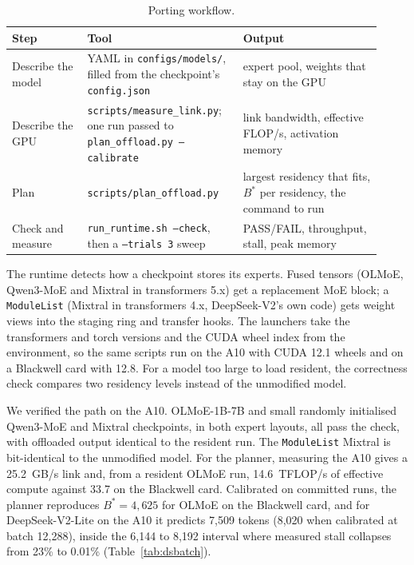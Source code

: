 \documentclass[10pt,a4paper]{article}
\begin{document}
\begin{table}[htbp]
\centering\small
\caption{Porting workflow.}
\label{tab:portsteps}
\begin{tabular}{>{\raggedright\arraybackslash}p{0.19\linewidth}>{\raggedright\arraybackslash}p{0.38\linewidth}>{\raggedright\arraybackslash}p{0.35\linewidth}}
\toprule
Step & Tool & Output \\
\midrule
Describe the model & YAML in \texttt{configs/models/}, filled from the checkpoint's \texttt{config.json} & expert pool, weights that stay on the GPU \\
Describe the GPU & \texttt{scripts/measure\_link.py}; one run passed to \texttt{plan\_offload.py --calibrate} & link bandwidth, effective FLOP/s, activation memory \\
Plan & \texttt{scripts/plan\_offload.py} & largest residency that fits, $B^{*}$ per residency, the command to run \\
Check and measure & \texttt{run\_runtime.sh --check}, then a \texttt{--trials 3} sweep & PASS/FAIL, throughput, stall, peak memory \\
\bottomrule
\end{tabular}
\end{table}

The runtime detects how a checkpoint stores its experts. Fused tensors (OLMoE,
Qwen3-MoE and Mixtral in transformers 5.x) get a replacement MoE block; a
\texttt{ModuleList} (Mixtral in transformers 4.x, DeepSeek-V2's own code) gets
weight views into the staging ring and transfer hooks. The launchers take the
transformers and torch versions and the CUDA wheel index from the environment, so
the same scripts run on the A10 with CUDA 12.1 wheels and on a Blackwell card with
12.8. For a model too large to load resident, the correctness check compares two
residency levels instead of the unmodified model.

We verified the path on the A10. OLMoE-1B-7B and small randomly initialised
Qwen3-MoE and Mixtral checkpoints, in both expert layouts, all pass the check, with
offloaded output identical to the resident run. The \texttt{ModuleList} Mixtral is
bit-identical to the unmodified model. For the planner, measuring the A10 gives a
25.2~GB/s link and, from a resident OLMoE run, 14.6~TFLOP/s of effective compute
against 33.7 on the Blackwell card. Calibrated on committed runs, the planner
reproduces $B^{*}=4{,}625$ for OLMoE on the Blackwell card, and for DeepSeek-V2-Lite
on the A10 it predicts 7{,}509 tokens (8{,}020 when calibrated at batch 12{,}288),
inside the 6{,}144 to 8{,}192 interval where measured stall collapses from 23\% to
0.01\% (Table~\ref{tab:dsbatch}).
\end{document}
